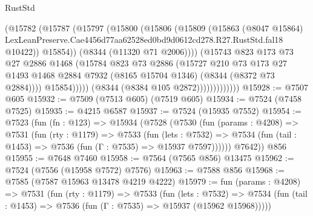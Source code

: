 \begin{lexlean}{RustStd}
\begin{coremodule}
                                (@15782
                                  (@15787
                                    (@15797
                                      (@15800
                                        (@15806
                                          (@15809
                                            (@15863
                                              (@8047 @15864)
                                              LexLeanPreserve.Cae4456d77aa62528ed0bd9d0612cd278.R27.RustStd.fal18
                                              @10422))
                                          @15854))
                                      (@8344 (@11320 @71 @2006))))
                                  (@15743
                                    @823
                                    @173
                                    @73
                                    @27
                                    @2886
                                    @1468
                                    (@15784
                                      @823
                                      @73
                                      @2886
                                      (@15727
                                        @210
                                        @73
                                        @173
                                        @27
                                        @1493
                                        @1468
                                        @2884
                                        @7932
                                        (@8165 @15704 @1346)
                                        (@8344 (@8372 @73 @2884))))
                                    @15854)))))
                          (@8344 (@8384 @105 @2872)))))))))))))
@15928 := @7507 @605
@15932 := @7509 (@7513 @605) (@7519 @605)
@15934 := @7524 (@7458 @7525)
@15935 := @4215 @6587
@15937 := @7524 (@15935 @7552)
@15954 := @7523
    (fun (fn : @123) =>
    @15934
      (@7528
        (@7530
          (fun (params : @4208) =>
          @7531
            (fun (rty : @1179) =>
            @7533
              (fun (lets : @7532) =>
              @7534 (fun (tail : @1453) => @7536 (fun (Γ : @7535) => @15937 @7597))))))
        @7642))
    @856
@15955 := @7648 @7460
@15958 := @7564 (@7565 @856) @13475
@15962 := @7524 (@7556 (@15958 @7572) @7576)
@15963 := @7588 @856
@15968 := @7585 (@7587 @15963 @13478 @4219 @4222)
@15979 := fun (params : @4208) =>
  @7531
    (fun (rty : @1179) =>
    @7533
      (fun (lets : @7532) =>
      @7534 (fun (tail : @1453) => @7536 (fun (Γ : @7535) => @15937 (@15962 @15968)))))

\end{coremodule}
\end{lexlean}
